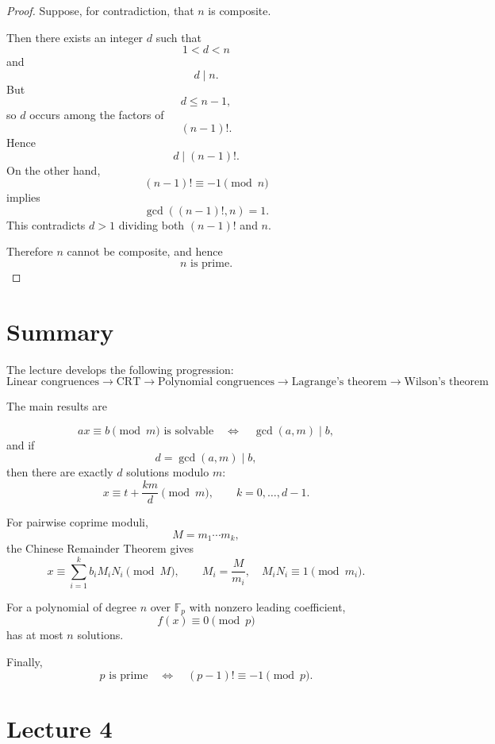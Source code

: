 \documentclass[11pt]{article}
\theoremstyle{remark}
\DeclareMathOperator{\gcdop}{gcd}
\newcommand{\Fp}{\mathbb F_p}
\begin{document}
\begin{proof}
Suppose, for contradiction, that $n$ is composite.

Then there exists an integer $d$ such that
\[
    1<d<n
\]
and
\[
    d\mid n.
\]
But
\[
    d\le n-1,
\]
so $d$ occurs among the factors of
\[
    (n-1)!.
\]
Hence
\[
    d\mid(n-1)!.
\]
On the other hand,
\[
    (n-1)!\equiv-1\pmod n
\]
implies
\[
    \gcdop((n-1)!,n)=1.
\]
This contradicts $d>1$ dividing both $(n-1)!$ and $n$.

Therefore $n$ cannot be composite, and hence
\[
    \boxed{n\text{ is prime}.}
\]
\end{proof}

\section*{Summary}

The lecture develops the following progression:
\[
\boxed{
\text{Linear congruences}
\longrightarrow
\text{CRT}
\longrightarrow
\text{Polynomial congruences}
\longrightarrow
\text{Lagrange's theorem}
\longrightarrow
\text{Wilson's theorem}
}.
\]

The main results are

\[
    ax\equiv b\pmod m
    \text{ is solvable}
    \quad\Longleftrightarrow\quad
    \gcdop(a,m)\mid b,
\]
and if
\[
    d=\gcdop(a,m)\mid b,
\]
then there are exactly $d$ solutions modulo $m$:
\[
    \boxed{
    x\equiv t+\frac{km}{d}\pmod m,
    \qquad
    k=0,\ldots,d-1.
    }
\]

For pairwise coprime moduli,
\[
    M=m_1\cdots m_k,
\]
the Chinese Remainder Theorem gives
\[
    \boxed{
    x\equiv
    \sum_{i=1}^k b_iM_iN_i
    \pmod M,
    \qquad
    M_i=\frac{M}{m_i},
    \quad
    M_iN_i\equiv1\pmod{m_i}.
    }
\]

For a polynomial of degree $n$ over $\Fp$ with nonzero leading
coefficient,
\[
    f(x)\equiv0\pmod p
\]
has at most $n$ solutions.

Finally,
\[
    \boxed{
    p\text{ is prime}
    \quad\Longleftrightarrow\quad
    (p-1)!\equiv-1\pmod p.
    }
\]

\clearpage

\section*{Lecture 4}
\end{document}
